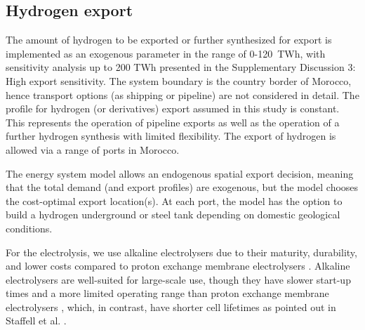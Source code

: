 \documentclass[5p,numafflabel]{elsarticle}
\begin{document}
\subsection*{Hydrogen export}
\label{subsec:hydrogen_export}
The amount of hydrogen to be exported or further synthesized for export is  implemented as an exogenous parameter in the range of 0-120~TWh, with sensitivity analysis up to 200 TWh presented in the Supplementary Discussion 3: High export sensitivity.
The system boundary is the country border of Morocco, hence transport options (as shipping or pipeline) are not considered in detail. The profile for hydrogen (or derivatives) export assumed in this study is constant. This represents the operation of pipeline exports as well as the operation of a further hydrogen synthesis with limited flexibility. The export of hydrogen is allowed via a range of ports in Morocco.


The energy system model allows an endogenous spatial export decision, meaning that the total demand (and export profiles) are exogenous, but the model chooses the  cost-optimal export location(s). At each port, the model has the option to build a hydrogen underground or steel tank depending on domestic geological conditions.

For the electrolysis, we use alkaline electrolysers due to their maturity, durability, and lower costs compared to proton exchange membrane electrolysers \cite{Staffell2019,DEA2019TechnologyData}.
Alkaline electrolysers are well-suited for large-scale use, though they have slower start-up times and a more limited operating range   
than proton exchange membrane electrolysers \cite{Staffell2019, Gotz2016}, which, in contrast, have  shorter cell lifetimes as pointed out in Staffell et al. \cite{Staffell2019}.







\end{document}
